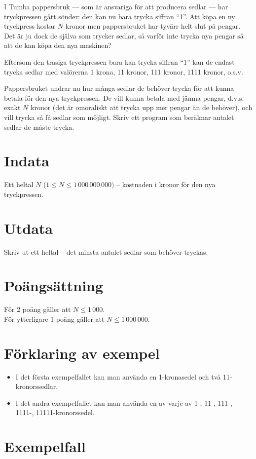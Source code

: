 I Tumba pappersbruk --- som är ansvariga för att producera sedlar --- har tryckpressen gått sönder: den kan nu bara trycka siffran ``1''.
Att köpa en ny tryckpress kostar $N$ kronor men pappersbruket har tyvärr helt slut på pengar.
Det är ju dock de själva som trycker sedlar, så varför inte trycka nya pengar så att de kan köpa den nya maskinen?

Eftersom den trasiga tryckpressen bara kan trycka siffran ``1'' kan de endast trycka sedlar med valörerna 1 krona, 11 kronor, 111 kronor, 1111 kronor, o.s.v.

Pappersbruket undrar nu hur många sedlar de behöver trycka för att kunna betala för den nya tryckpressen.
De vill kunna betala med jämna pengar, d.v.s. exakt $N$ kronor (det är omoraliskt att trycka upp mer pengar än de behöver), och vill trycka så få sedlar som möjligt.
Skriv ett program som beräknar antalet sedlar de måste trycka.

\section*{Indata}
Ett heltal $N$ ($1 \le N \le 1\,000\,000\,000)$ -- kostnaden i kronor för den nya tryckpressen.

\section*{Utdata}
Skriv ut ett heltal -- det minsta antalet sedlar som behöver tryckas.

\section*{Poängsättning}
För 2 poäng gäller att $N \le 1\,000$. \\
För ytterligare 1 poäng gäller att $N \le 1\,000\,000$.

\section*{Förklaring av exempel}
\begin{itemize}
  \item I det första exempelfallet kan man använda en 1-kronasedel och två 11-kronorssedlar.
  \item I det andra exempelfallet kan man använda en av varje av 1-, 11-, 111-, 1111-, 11111-kronorssedel.
\end{itemize}

\section*{Exempelfall}
